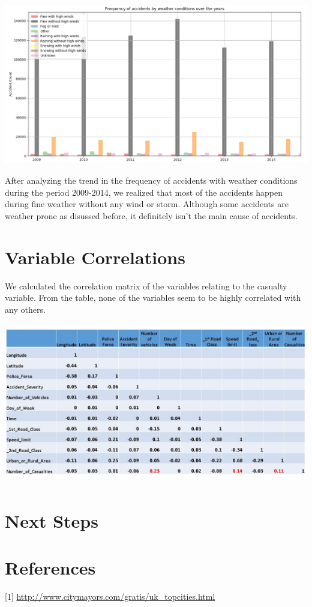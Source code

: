 \documentclass[a4paper, 10pt]{article}
\begin{document}
   \begin{center}
     \includegraphics[width=70cm,height=7cm, scale=0.4,keepaspectratio]{weather-study.png}
   \end{center}

   After analyzing the trend in the frequency of accidents with weather conditions during the period 2009-2014, we realized that most of the accidents happen during fine weather without any wind or storm.
 Although some accidents are weather prone as disussed before, it definitely isn't the main cause of accidents.
   
   \section{Variable Correlations}
   We calculated the correlation matrix of the variables relating to the casualty variable. From the table, none of the variables seem to be highly correlated with any others.
   \begin{center}
     \includegraphics[width=70cm,height=7cm, scale=0.4,keepaspectratio]{correlation.png}
   \end{center}
   
   \section{Next Steps}
   
 \section{References}
 [1] \url{http://www.citymayors.com/gratis/uk\_topcities.html}
\end{document}
